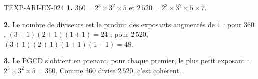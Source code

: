 \begin{corrige}{TEXP-ARI-EX-024}
\textbf{1.} $360=2^3\times3^2\times5$ et $2\,520=2^3\times3^2\times5\times7$.

\textbf{2.} Le nombre de diviseurs est le produit des exposants augmentés de
$1$ : pour $360$, $(3+1)(2+1)(1+1)=24$ ; pour $2\,520$,
$(3+1)(2+1)(1+1)(1+1)=48$.

\textbf{3.} Le PGCD s'obtient en prenant, pour chaque premier, le plus petit
exposant : $2^3\times3^2\times5=360$. Comme $360$ divise $2\,520$, c'est
cohérent.
\end{corrige}
